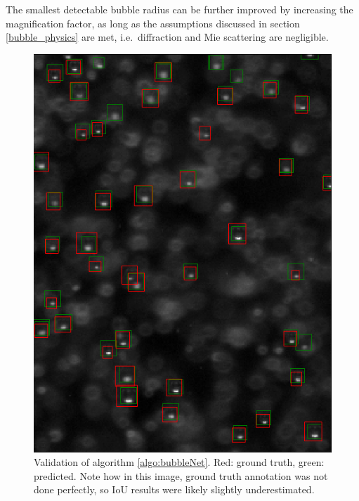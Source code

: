 			 The smallest detectable bubble radius can be further improved by increasing the magnification factor, as long as the assumptions discussed in section \ref{bubble_physics} are met, i.e.\ diffraction and Mie scattering are negligible. 
			 
			 
			
			\begin{figure}[h!]
				\centering
				\includegraphics[scale=0.8]{images/bubbleNet_validation_result.png}
				\caption{Validation of algorithm \ref{algo:bubbleNet}. Red: ground truth, green: predicted. Note how in this image, ground truth annotation was not done perfectly, so IoU results were likely slightly underestimated.}
				\label{fig:bubbleNet_result}
			\end{figure}



